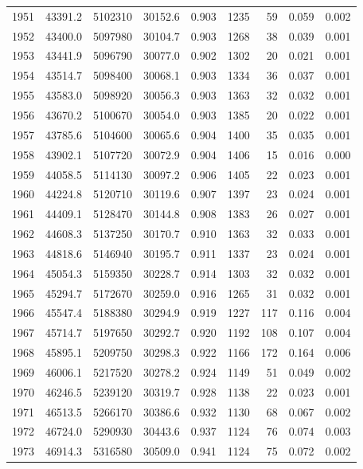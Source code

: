 \documentclass[
]{scrartcl}
\begin{document}
\begin{table}
{\begin{tabular*}{\linewidth}{@{\extracolsep{\fill}}rrrrrrrrr}
1951 & 43391.2 & 5102310 & 30152.6 & 0.903 & 1235 & 59 & 0.059 & 0.002 \\ 
1952 & 43400.0 & 5097980 & 30104.7 & 0.903 & 1268 & 38 & 0.039 & 0.001 \\ 
1953 & 43441.9 & 5096790 & 30077.0 & 0.902 & 1302 & 20 & 0.021 & 0.001 \\ 
1954 & 43514.7 & 5098400 & 30068.1 & 0.903 & 1334 & 36 & 0.037 & 0.001 \\ 
1955 & 43583.0 & 5098920 & 30056.3 & 0.903 & 1363 & 32 & 0.032 & 0.001 \\ 
1956 & 43670.2 & 5100670 & 30054.0 & 0.903 & 1385 & 20 & 0.022 & 0.001 \\ 
1957 & 43785.6 & 5104600 & 30065.6 & 0.904 & 1400 & 35 & 0.035 & 0.001 \\ 
1958 & 43902.1 & 5107720 & 30072.9 & 0.904 & 1406 & 15 & 0.016 & 0.000 \\ 
1959 & 44058.5 & 5114130 & 30097.2 & 0.906 & 1405 & 22 & 0.023 & 0.001 \\ 
1960 & 44224.8 & 5120710 & 30119.6 & 0.907 & 1397 & 23 & 0.024 & 0.001 \\ 
1961 & 44409.1 & 5128470 & 30144.8 & 0.908 & 1383 & 26 & 0.027 & 0.001 \\ 
1962 & 44608.3 & 5137250 & 30170.7 & 0.910 & 1363 & 32 & 0.033 & 0.001 \\ 
1963 & 44818.6 & 5146940 & 30195.7 & 0.911 & 1337 & 23 & 0.024 & 0.001 \\ 
1964 & 45054.3 & 5159350 & 30228.7 & 0.914 & 1303 & 32 & 0.032 & 0.001 \\ 
1965 & 45294.7 & 5172670 & 30259.0 & 0.916 & 1265 & 31 & 0.032 & 0.001 \\ 
1966 & 45547.4 & 5188380 & 30294.9 & 0.919 & 1227 & 117 & 0.116 & 0.004 \\ 
1967 & 45714.7 & 5197650 & 30292.7 & 0.920 & 1192 & 108 & 0.107 & 0.004 \\ 
1968 & 45895.1 & 5209750 & 30298.3 & 0.922 & 1166 & 172 & 0.164 & 0.006 \\ 
1969 & 46006.1 & 5217520 & 30278.2 & 0.924 & 1149 & 51 & 0.049 & 0.002 \\ 
1970 & 46246.5 & 5239120 & 30319.7 & 0.928 & 1138 & 22 & 0.023 & 0.001 \\ 
1971 & 46513.5 & 5266170 & 30386.6 & 0.932 & 1130 & 68 & 0.067 & 0.002 \\ 
1972 & 46724.0 & 5290930 & 30443.6 & 0.937 & 1124 & 76 & 0.074 & 0.003 \\ 
1973 & 46914.3 & 5316580 & 30509.0 & 0.941 & 1124 & 75 & 0.072 & 0.002 \\ 

\end{tabular*}}
\end{table}
\end{document}
